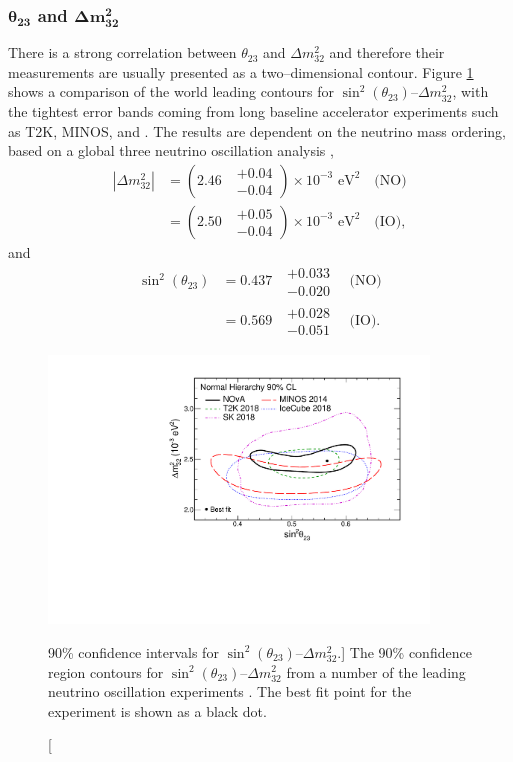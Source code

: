 {\subsubsection*{$\boldsymbol{\theta_{23}}$ and $\boldsymbol{\Delta m^2_{32}}$}

There is a strong correlation between $\theta_{23}$ and $\Delta m^2_{32}$ and
therefore their measurements are usually presented as a two--dimensional
contour. Figure \ref{fig:delm_sin23} shows a comparison of the world leading
contours for $\sin^2 (\theta_{23})$--$\Delta m^2_{32}$, with the tightest error
bands coming from long baseline accelerator experiments such as T2K, MINOS, and 
\nova{} \cite{PhysRevD.96.092006, PhysRevLett.112.191801,
PhysRevLett.123.151803}. The results are dependent on the neutrino mass
ordering, based on a global three neutrino oscillation analysis 
\cite{Capozzi:2016rtj}, 
\begin{align}
	\label{eqn:delta_m_32}
	|\Delta m^2_{32}| &= (2.46 \mbox{ } \substack{+ 0.04 \\ - 0.04}) \times 10^{-3} \mbox{  eV}^2 \quad \mbox{(NO)}  \nonumber\\
	                  &= (2.50 \mbox{ } \substack{+ 0.05 \\ - 0.04}) \times 10^{-3} \mbox{  eV}^2 \quad \mbox{(IO)},
\end{align}
and 
\begin{align}
	\label{eqn:delta_m_32}
	\sin^2(\theta_{23}) &= 0.437 \mbox{  } \substack{+ 0.033 \\ - 0.020} \quad \mbox{(NO)} \nonumber \\
	                    &= 0.569 \mbox{  } \substack{+ 0.028 \\ - 0.051} \quad \mbox{(IO)}.
\end{align}

\begin{figure}
	\centering
	\includegraphics[width=0.9\textwidth]{figures/theta23_msquare.pdf}
	\caption 
	[90\% confidence intervals for $\sin^2 (\theta_{23})$--$\Delta m^2_{32}$.]
	{The 90\% confidence region contours for 
	$\sin^2 (\theta_{23})$--$\Delta m^2_{32}$ from a number of the leading 
	neutrino oscillation experiments \cite{PhysRevD.96.092006, 
	PhysRevLett.112.191801, PhysRevLett.123.151803}. The best fit point for the
	\nova{} experiment is shown as a black dot. \cite{PhysRevLett.123.151803}}
	\label{fig:delm_sin23}
\end{figure}

}
